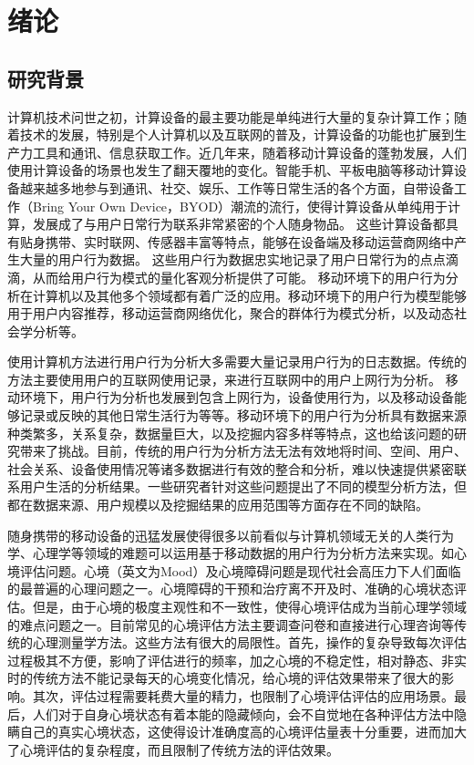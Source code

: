 \chapter{绪论}
\label{cha:intro}

\section{研究背景}
计算机技术问世之初，计算设备的最主要功能是单纯进行大量的复杂计算工作；随着技术的发展，特别是个人计算机以及互联网的普及，计算设备的功能也扩展到生产力工具和通讯、信息获取工作。近几年来，随着移动计算设备的蓬勃发展\cite{forman1994challenges}\cite{satyanarayanan2011mobile}，人们使用计算设备的场景也发生了翻天覆地的变化。智能手机、平板电脑等移动计算设备越来越多地参与到通讯、社交、娱乐、工作等日常生活的各个方面，自带设备工作（Bring Your Own Device，BYOD）潮流的流行，使得计算设备从单纯用于计算，发展成了与用户日常行为联系非常紧密的个人随身物品。
这些计算设备都具有贴身携带、实时联网、传感器丰富等特点，能够在设备端及移动运营商网络中产生大量的用户行为数据。
这些用户行为数据忠实地记录了用户日常行为的点点滴滴，从而给用户行为模式的量化客观分析提供了可能\cite{mascolo2011mobile}\cite{laurila2012mobile}。
移动环境下的用户行为分析在计算机以及其他多个领域都有着广泛的应用。移动环境下的用户行为模型能够用于用户内容推荐，移动运营商网络优化，聚合的群体行为模式分析，以及动态社会学分析等。


使用计算机方法进行用户行为分析大多需要大量记录用户行为的日志数据。传统的方法主要使用用户的互联网使用记录，来进行互联网中的用户上网行为分析\cite{liu2008identifying}\cite{granka2004eye}。 移动环境下，用户行为分析也发展到包含上网行为，设备使用行为，以及移动设备能够记录或反映的其他日常生活行为等等。移动环境下的用户行为分析具有数据来源种类繁多，关系复杂，数据量巨大，以及挖掘内容多样等特点，这也给该问题的研究带来了挑战。目前，传统的用户行为分析方法无法有效地将时间、空间、用户、社会关系、设备使用情况等诸多数据进行有效的整合和分析，难以快速提供紧密联系用户生活的分析结果。一些研究者针对这些问题提出了不同的模型分析方法\cite{www08cui}\cite{ist06tseng}\cite{infocom06kim}，但都在数据来源、用户规模以及挖掘结果的应用范围等方面存在不同的缺陷。

随身携带的移动设备的迅猛发展使得很多以前看似与计算机领域无关的人类行为学、心理学等领域的难题可以运用基于移动数据的用户行为分析方法来实现。如心境评估问题。心境（英文为Mood）及心境障碍问题是现代社会高压力下人们面临的最普遍的心理问题之一。心境障碍的干预和治疗离不开及时、准确的心境状态评估。但是，由于心境的极度主观性和不一致性，使得心境评估成为当前心理学领域的难点问题之一。目前常见的心境评估方法主要调查问卷和直接进行心理咨询等传统的心理测量学方法。这些方法有很大的局限性。首先，操作的复杂导致每次评估过程极其不方便，影响了评估进行的频率，加之心境的不稳定性，相对静态、非实时的传统方法不能记录每天的心境变化情况，给心境的评估效果带来了很大的影响。其次，评估过程需要耗费大量的精力，也限制了心境评估评估的应用场景。最后，人们对于自身心境状态有着本能的隐藏倾向，会不自觉地在各种评估方法中隐瞒自己的真实心境状态，这使得设计准确度高的心境评估量表十分重要，进而加大了心境评估的复杂程度，而且限制了传统方法的评估效果。

